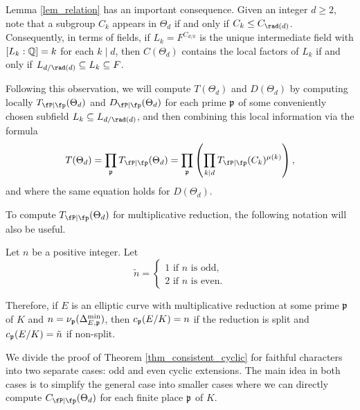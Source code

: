 \begin{rem}\label{rem_radical}
    Lemma \ref{lem_relation} has an important consequence. Given an integer $d\geq2$, note that a subgroup $C_k$ appears in $\Theta_d$ if and only if $C_k\leq C_{\rad(d)}$. Consequently, in terms of fields, if $L_k=F^{C_{d/k}}$ is the unique intermediate field with $[L_k:\mathbb{Q}]=k$ for each $k\mid d$, then $C(\Theta_d)$ contains the local factors of $L_k$ if and only if $L_{d/\rad(d)}\subseteq L_k\subseteq F$.

    Following this observation, we will compute $T(\Theta_d)$ and $D(\Theta_d)$ by computing locally $\Tp(\Theta_d)$ and $\Dp(\Theta_d)$ for each prime $\mathfrak{p}$ of some conveniently chosen subfield $L_k\subseteq L_{d/\rad(d)}$, and then combining this local information via the formula
    \begin{equation}\label{eqn_local_contr}
        T(\Theta_d)=\prod_{\pp}\Tp(\Theta_d)=\prod_\pp\left(\prod_{k\mid d} \Tp(C_k)^{\mu(k)}\right),    
    \end{equation}
    and where the same equation holds for $D(\Theta_d)$.
\end{rem}

To compute $\Tp(\Theta_d)$ for multiplicative reduction, the following notation will also be useful.

\begin{notation}\label{not_n}
    Let $n$ be a positive integer. Let 
    \[
        \tilde{n}=
        \begin{cases}
            1 \text{ if } n \text{ is odd,}\\
            2 \text{ if } n \text{ is even.}
        \end{cases}
    \]
\end{notation}
Therefore, if $E$ is an elliptic curve with multiplicative reduction at some prime $\mathfrak{p}$ of $K$ and $n=\nu_{\mathfrak{p}}(\Delta_{E,\mathfrak{p}}^{\min})$, then $c_{\mathfrak{p}}(E/K)=n$ if the reduction is split and $c_{\mathfrak{p}}(E/K)=\tilde{n}$ if non-split.

We divide the proof of Theorem \ref{thm_consistent_cyclic} for faithful characters into two separate cases: odd and even cyclic extensions. The main idea in both cases is to simplify the general case into smaller cases where we can directly compute $\Cp(\Theta_d)$ for each finite place $\mathfrak{p}$ of $K$.



 

